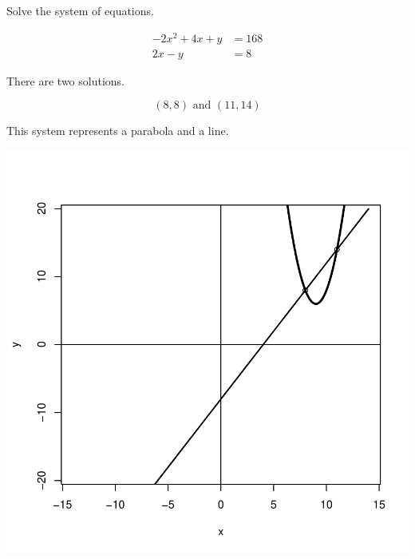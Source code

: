 
\begin{question}
Solve the system of equations.

\[\begin{aligned}
- 2 x^{2} + 4 x + y &= 168 \\
2 x - y &= 8
\end{aligned}\]
\end{question}

\begin{solution}
There are two solutions.

\[(8,8) \text{ and } (11,14) \]

This system represents a parabola and a line.

\includegraphics{unnamed-chunk-2-1.pdf}\\
\end{solution}

